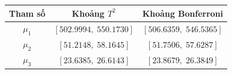 \begin{center}\begin{tabular}{ccc}\toprule
Tham số & Khoảng $T^2$ & Khoảng Bonferroni\\\midrule
$\mu_1$ & $[502.9994,\;550.1730]$ & $[506.6359,\;546.5365]$\\
$\mu_2$ & $[51.2148,\;58.1645]$ & $[51.7506,\;57.6287]$\\
$\mu_3$ & $[23.6385,\;26.6143]$ & $[23.8679,\;26.3849]$\\
\bottomrule\end{tabular}\end{center}
